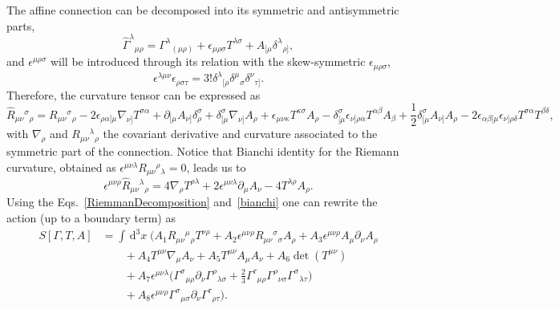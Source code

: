 \documentclass{ws-mpla}
\renewcommand{\(}{\left(}
\renewcommand{\)}{\right)}
\renewcommand{\[}{\left[}
\renewcommand{\]}{\right]}
\newcommand{\dn}[2]{\,{\mathrm{d}}^{#1}\!{#2}\;}
\begin{document}
The affine connection can be decomposed into its symmetric and antisymmetric parts, 
\begin{equation}
  \hat{\Gamma}^\lambda{}_{\mu\rho} = {\Gamma}^\lambda{}_{(\mu\rho)} + \epsilon_{\mu\rho\sigma}T^{\lambda\sigma} + A_{[\mu}\delta^\lambda{}_{\rho]},
\end{equation}
and  $\epsilon^{\mu\rho\sigma}$ will be introduced through its relation with the skew-symmetric $\epsilon_{\mu\rho\sigma}$, $$\epsilon^{\lambda\mu\nu}\epsilon_{\rho\sigma\tau}=3!\delta^{\lambda}{}_{[\rho}\delta^\mu{}_{\sigma}\delta^{\nu}{}_{\tau]}.$$ Therefore, the curvature tensor can be expressed as 
\begin{dmath}
  \label{RiemmanDecomposition}
  \hat{R}_{\mu\nu}{}^\sigma{}_\rho=
  {R}_{\mu\nu}{}^\sigma{}_\rho
  -2\epsilon_{\rho\alpha[\mu}\nabla_{\nu]}T^{\sigma\alpha}
  +\partial_{[\mu}A_{\nu]}\delta^\sigma_\rho
  +\delta^\sigma_{[\mu}\nabla_{\nu]}A_\rho
  +\epsilon_{\mu\nu\kappa}T^{\kappa\sigma}A_\rho
  -\delta^\sigma_{[\mu}\epsilon_{\nu]\rho\alpha}T^{\alpha\beta}A_\beta 
  +\frac{1}{2}\delta^\sigma_{[\mu}A_{\nu]}A_\rho
  -2\epsilon_{\alpha\beta[\mu}\epsilon_{\nu]\rho\delta}T^{\sigma\alpha}T^{\beta\delta},
\end{dmath}
with $\nabla_\rho$ and ${R}_{\mu\nu}{}^\lambda{}_\rho$ the covariant derivative and  curvature associated to the symmetric part of the connection. Notice that Bianchi identity for the Riemann curvature, obtained as $\epsilon^{\mu\nu\lambda} {R}_{\mu\nu}{}^\rho{}_\lambda=0$, leads us to
\begin{equation}
  \label{bianchi}
  \epsilon^{\mu\nu\rho} \hat{R}_{\mu\nu}{}^\lambda{}_\rho = 4\nabla_\rho T^{\rho\lambda}
  +2\epsilon^{\mu\nu\lambda}\partial_\mu A_\nu-4T^{\lambda\rho}A_\rho. 
\end{equation}
Using the  Eqs.~\eqref{RiemmanDecomposition} and~\eqref{bianchi} one can rewrite the action (up to a boundary term) as
\begin{equation}
  \begin{split}    
    S[\Gamma,T,A] &=
    \int \dn{3}{x} \bigg( 
    A_1{R}_{\mu\nu}{}^{\mu}{}_\rho T^{\nu\rho} 
    +A_2\epsilon^{\mu\nu\rho}{R}_{\mu\nu}{}^{\sigma}{}_\sigma A_\rho
    +A_3\epsilon^{\mu\nu\rho}A_\mu\partial_\nu A_\rho
    \\
    & \qquad
    +A_4T^{\mu\nu}{\nabla}_\mu A_\nu
    +A_5T^{\mu\nu}A_\mu A_\nu
    +A_6\det(T^{\mu\nu}) 
    \\
    & \qquad
    +A_7\epsilon^{\mu\nu\lambda}\Big({\Gamma}^{\sigma}{}_{\mu\rho}\partial_\nu{\Gamma}^{\rho}{}_{\lambda\sigma}
    +\frac{2}{3}{\Gamma}^{\tau}{}_{\mu\rho}{\Gamma}^{\rho}{}_{\nu\sigma}{}{\Gamma}^{\sigma}{}_{\lambda\tau}{}\Big)
    \\
    & \qquad
    + A_8\epsilon^{\mu\nu\rho}{\Gamma}^{\sigma}{}_{\mu\sigma}\partial_\nu{\Gamma}^{\tau}{}_{\rho\tau}
    \bigg).
  \end{split}
  \label{accion3dfinal}
\end{equation}
\end{document}
